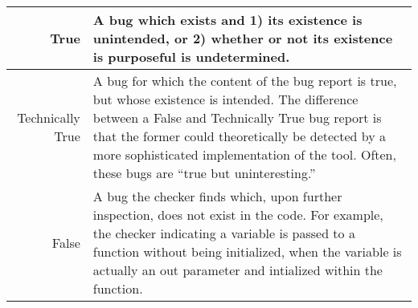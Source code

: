 \begin{center}
  \noindent\begin{tabularx}{0.75\textwidth}{rX}
    \toprule
    True & A bug which exists and 1) its existence is unintended, or 2) whether or not its existence is purposeful is undetermined. \\
    \midrule
    Technically True & A bug for which the content of the bug report is true, but whose existence is intended. The difference between a False and Technically True bug report is that the former could theoretically be detected by a more sophisticated implementation of the tool. Often, these bugs are ``true but uninteresting.''\\
    \midrule
    False & A bug the checker finds which, upon further inspection, does not exist in the code. For example, the checker indicating a variable is passed to a function without being initialized, when the variable is actually an out parameter and intialized within the function.\\
    \bottomrule
  \end{tabularx}
\end{center}
